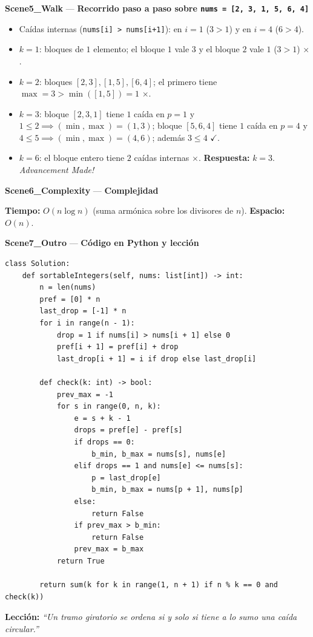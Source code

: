 \documentclass[letterpaper,10pt]{article}
\newcommand{\scene}[2]{\noindent\textbf{\textcolor{mcaqua}{#1}} --- \textbf{#2}\par\vspace{1pt}}
\begin{document}
\begin{shaded}
\scene{Scene5\_Walk}{Recorrido paso a paso sobre \texttt{nums = [2, 3, 1, 5, 6, 4]}}
\begin{itemize}\setlength{\itemsep}{1pt}
  \item Ca\'idas internas (\texttt{nums[i] > nums[i+1]}): en $i=1$ ($3 > 1$) y en $i=4$ ($6 > 4$).
  \item $k = 1$: bloques de $1$ elemento; el bloque $1$ vale $3$ y el bloque $2$ vale $1$ ($3 > 1$) $\times$.
  \item $k = 2$: bloques $[2,3], [1,5], [6,4]$; el primero tiene $\max = 3 > \min([1,5]) = 1$ $\times$.
  \item $k = 3$: bloque $[2,3,1]$ tiene $1$ ca\'ida en $p=1$ y $1 \le 2 \implies (\min,\max) = (1,3)$; bloque $[5,6,4]$ tiene $1$ ca\'ida en $p=4$ y $4 \le 5 \implies (\min,\max) = (4,6)$; adem\'as $3 \le 4$ $\checkmark$.
  \item $k = 6$: el bloque entero tiene $2$ ca\'idas internas $\times$. \textbf{Respuesta:} $k = 3$. \textit{Advancement Made!}
\end{itemize}

\scene{Scene6\_Complexity}{Complejidad}
\textbf{Tiempo:} $O(n \log n)$ (suma arm\'onica sobre los divisores de $n$). \quad \textbf{Espacio:} $O(n)$.
\end{shaded}

\scene{Scene7\_Outro}{C\'odigo en Python y lecci\'on}
\begin{Verbatim}[frame=single,fontsize=\small]
class Solution:
    def sortableIntegers(self, nums: list[int]) -> int:
        n = len(nums)
        pref = [0] * n
        last_drop = [-1] * n
        for i in range(n - 1):
            drop = 1 if nums[i] > nums[i + 1] else 0
            pref[i + 1] = pref[i] + drop
            last_drop[i + 1] = i if drop else last_drop[i]

        def check(k: int) -> bool:
            prev_max = -1
            for s in range(0, n, k):
                e = s + k - 1
                drops = pref[e] - pref[s]
                if drops == 0:
                    b_min, b_max = nums[s], nums[e]
                elif drops == 1 and nums[e] <= nums[s]:
                    p = last_drop[e]
                    b_min, b_max = nums[p + 1], nums[p]
                else:
                    return False
                if prev_max > b_min:
                    return False
                prev_max = b_max
            return True

        return sum(k for k in range(1, n + 1) if n % k == 0 and check(k))
\end{Verbatim}
\textbf{Lecci\'on:} \textit{``Un tramo giratorio se ordena si y solo si tiene a lo sumo una ca\'ida circular.''}
\end{document}
